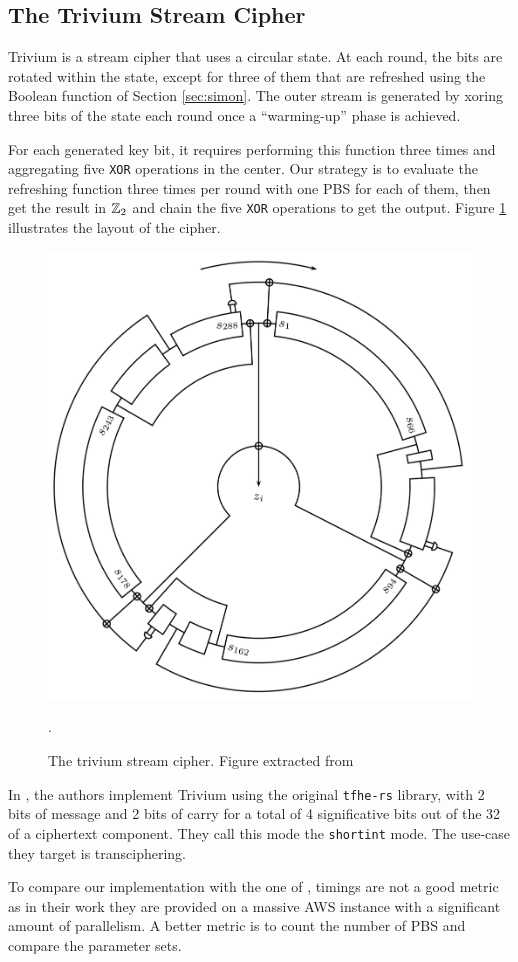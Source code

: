 \subsection{The Trivium Stream Cipher}
\label{sec:trivium}

Trivium \cite{ISC:DeCanniere06} is a stream cipher that uses a circular state. At each round, the bits are rotated within the state, except for three of them that are refreshed using the Boolean function of Section \ref{sec:simon}. The outer stream is generated by xoring three bits of the state each round once a ``warming-up'' phase is achieved. 


For each generated key bit, it requires performing this function three times and aggregating five \texttt{XOR} operations in the center. Our strategy is to evaluate the refreshing function three times per round with one PBS for each of them, then get the result in $\mathbb{Z}_2$ and chain the five \texttt{XOR} operations to get the output.
Figure \ref{fig:triviuml} illustrates the layout of the cipher.
\begin{figure}
    \centering
    \includegraphics[width=0.5\linewidth]{img/to_harmonize/trivium.png}
    \caption{The trivium stream cipher. Figure extracted from \cite{ISC:DeCanniere06}}.
    \label{fig:triviuml}
\end{figure}


In \cite{DBLP:conf/wahc/BalenboisOS23}, the authors implement Trivium using the original \texttt{tfhe-rs} library, with 2 bits of message and 2 bits of carry for a total of 4 significative bits out of the 32 of a ciphertext component. They call this mode the \texttt{shortint} mode. The use-case they target is transciphering.

To compare our implementation with the one of \cite{DBLP:conf/wahc/BalenboisOS23}, timings are not a good metric as in their work they are provided on a massive AWS instance with a significant amount of parallelism. A better metric is to count the number of PBS and compare the parameter sets.

